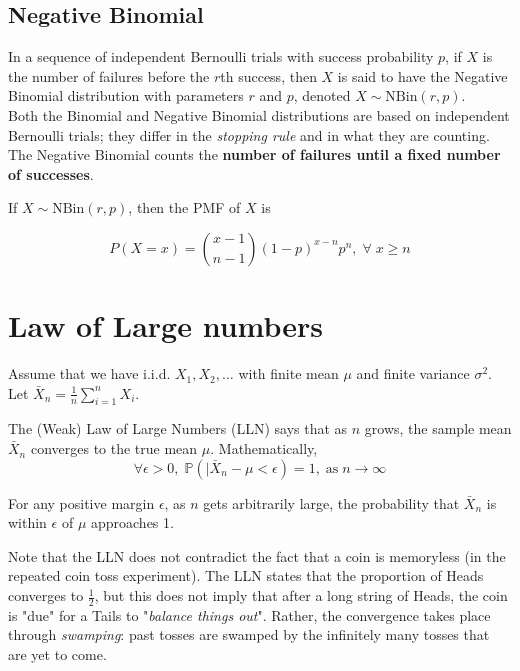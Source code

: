 \documentclass{article}
\begin{document}
\subsection{Negative Binomial}

In a sequence of independent Bernoulli trials with success probability $p$, if $X$ is the number of failures before the $r$th success, then $X$ is said to have the Negative Binomial distribution with parameters $r$ and $p$, denoted $X \sim \text{NBin}(r,p)$. \\ 

\noindent Both the Binomial and Negative Binomial distributions are based on independent Bernoulli trials; they differ in the \textit{stopping rule} and in what they are counting. The Negative Binomial counts the \textbf{number of failures until a fixed number of successes}. 

\begin{theorem}
    If $X \sim \text{NBin}(r,p)$, then the PMF of $X$ is 

    \begin{equation}
        P(X=x) = \binom{x-1}{n-1} (1-p)^{x-n}p^{n}, \; \forall \; x\geq n 
    \end{equation}
\end{theorem}





\section{Law of Large numbers}
Assume that we have i.i.d. $X_{1}, X_{2}, \dots$ with finite mean $\mu$ and finite variance $\sigma^{2}$. Let $\bar{X}_n = \frac{1}{n} \sum_{i=1}^{n} X_i$.

\begin{definition}
    The (Weak) Law of Large Numbers (LLN) says that as $n$ grows, the sample mean $\bar{X}_n$ converges to the true mean $\mu$. Mathematically, 
    \begin{equation}
        \forall \epsilon > 0, \; \mathbb{P}(|\bar{X}_n - \mu < \epsilon) = 1, \; \text{as} \; n \to \infty 
    \end{equation}

    \noindent For any positive margin $\epsilon$, as $n$ gets arbitrarily large, the probability that $\bar{X}_n$ is within $\epsilon$ of $\mu$ approaches 1. 
\end{definition}

\noindent Note that the LLN does not contradict the fact that a coin is memoryless (in the repeated coin toss experiment). The LLN states that the proportion of Heads converges to $\frac{1}{2}$, but this does not imply that after a long string of Heads, the coin is "due" for a Tails to "\textit{balance things out}". Rather, the convergence takes place through \textit{swamping}: past tosses are swamped by the infinitely many tosses that are yet to come.  
\end{document}
